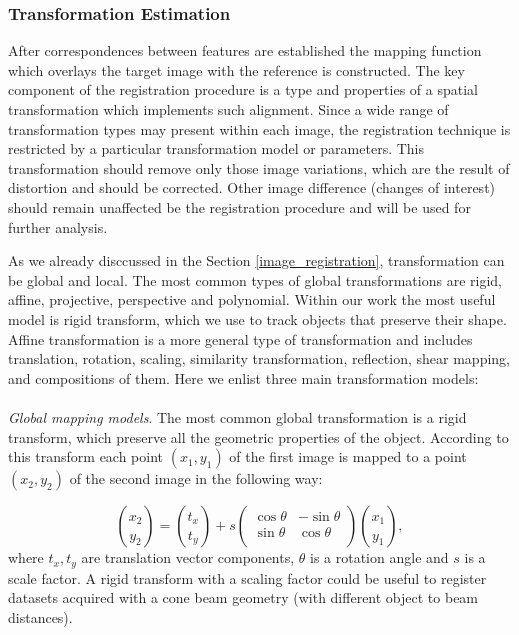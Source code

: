     
\subsubsection{Transformation Estimation}
\label{transform_estimation}

After correspondences between features are established
the mapping function which overlays the target image with the reference is constructed.
The key component of the registration procedure is a type and properties of a spatial transformation which implements such alignment.
 Since a wide range of transformation types may present within each image, the registration technique is restricted by a particular transformation model or parameters.
This transformation should remove only those image variations, which are the result of distortion and should be corrected. Other image difference (changes of interest) should remain unaffected be the registration procedure and will be used for further analysis. 

As we already disccussed in the Section \ref{image_registration}, transformation can be global and local.  The most common types of global transformations
are rigid, affine, projective, perspective
and polynomial. Within our work the most useful model is rigid transform, which we use to track  
objects that preserve their shape. Affine transformation is a more general type of transformation and includes translation, rotation, scaling, similarity transformation, reflection, shear mapping, and compositions of them.  Here we enlist three main transformation models:
\\
\\
\textit{Global mapping models}.
The most common global transformation is a rigid transform, which preserve all the geometric properties of the object. According to this transform each point $(x_1,y_1)$ of the first image is mapped to a point $(x_2, y_2)$ of the second image in the following way:

$${x_2 \choose y_2} = {t_x \choose t_y} + s
 \begin{pmatrix}
  \cos \theta & -\sin \theta  \\
  \sin \theta & \cos \theta \\
 \end{pmatrix} {x_1 \choose y_1},$$
where $t_x, t_y$ are translation vector components, $\theta$ is a rotation angle and $s$ is a scale factor. A rigid transform with a scaling factor could be useful to register datasets acquired with a cone beam geometry (with different object to beam distances). 


